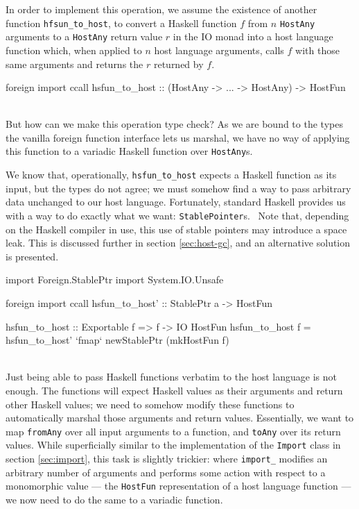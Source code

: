\documentclass[preprint]{sigplanconf}
\begin{document}
In order to implement this operation, we assume the existence of another
function \lstinline!hfsun_to_host!, to convert a Haskell function $f$ from $n$
\lstinline!HostAny! arguments to a \lstinline!HostAny! return value $r$ in the
IO monad into a host language function which, when applied to $n$ host
language arguments, calls $f$ with those same arguments and returns the $r$
returned by $f$.\\
\begin{code}
  foreign import ccall hsfun_to_host
    :: (HostAny -> ... -> HostAny) -> HostFun
\end{code}\\
But how can we make this operation type check?
As we are bound to the types the vanilla foreign function interface lets us
marshal, we have no way of applying this function to a variadic Haskell
function over \lstinline!HostAny!s.

We know that, operationally, \lstinline!hsfun_to_host! expects a Haskell
function as its input, but the types do not agree; we must somehow find a way
to pass arbitrary data unchanged to our host language.
Fortunately, standard Haskell provides us with a way to do exactly what we want:
\lstinline!StablePointer!s.\ \cite{stableptr} Note that, depending on the
Haskell compiler in use, this use of stable pointers may introduce a space
leak. This is discussed further in section \ref{sec:host-gc}, and an
alternative solution is presented.\\
\begin{code}
  import Foreign.StablePtr
  import System.IO.Unsafe

  foreign import ccall
    hsfun_to_host' :: StablePtr a -> HostFun

  hsfun_to_host :: Exportable f => f -> IO HostFun
  hsfun_to_host f =
    hsfun_to_host' `fmap` newStablePtr (mkHostFun f)
\end{code}\\
Just being able to pass Haskell functions verbatim to the host language is not
enough. The functions will expect Haskell values as their arguments and return
other Haskell values; we need to somehow modify these functions to
automatically marshal those arguments and return values.
Essentially, we want to map
\lstinline!fromAny! over all input arguments to a function, and
\lstinline!toAny! over its return values.
While superficially similar to the implementation of the \lstinline!Import!
class in section \ref{sec:import}, this task is slightly trickier:
where \lstinline!import_! modifies an arbitrary number of arguments and
performs some action with respect to a monomorphic value --- the
\lstinline!HostFun! representation of a host language function --- we now need
to do the same to a variadic function.
\end{document}
